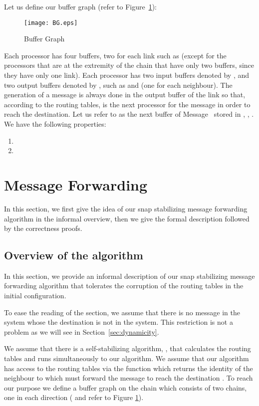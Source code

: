 \documentclass{llncs}
\begin{document}
Let us define our buffer graph (refer to Figure~\ref{BG}):

\begin{figure}
   \centering
   \texttt{[image: BG.eps]}
   \caption{Buffer Graph}\label{BG}
\end{figure} 
 


\noindent
Each processor  has four buffers, two for each link  such as  (except for the processors that
are at the extremity of the chain that have only two buffers, since they have only one link). Each processor has two
input buffers denoted by ,  and two output buffers denoted by ,  such as  and  (one for each neighbour). The generation of a message is always done in the output buffer of the
link  so that, according to the routing tables,  is the next processor for the message in order to reach 
the destination.  Let us refer to  as the next buffer of Message~ stored in ,  
, . We have the following properties:
\begin{enumerate}
\item 
\item 
\end{enumerate}  







 
\section{Message Forwarding\label{sec:algo}}

In this section, we first give the idea of our snap stabilizing message forwarding algorithm in the informal overview, 
then we give the formal description followed by the correctness proofs. 

\subsection{Overview of the algorithm}

In this section, we provide an informal description of our snap stabilizing message forwarding algorithm that 
tolerates the corruption of the routing tables in the initial configuration. 

To ease the reading of the section, we assume that there is no message in the system whose the destination is not
in the system.  This restriction is not a problem as we will see in Section~\ref{sec:dynamicity}.

We assume that there is a self-stabilizing algorithm, , that calculates the routing tables and runs simultaneously to our
algorithm. We assume that our algorithm has access to the routing tables
via the function  which returns the identity of the neighbour to which  must forward the message to
reach the destination . To reach our purpose we define a buffer graph on the chain which consists of two chains,
one in each direction ( and  refer to Figure \ref{BG}). 
\end{document}
